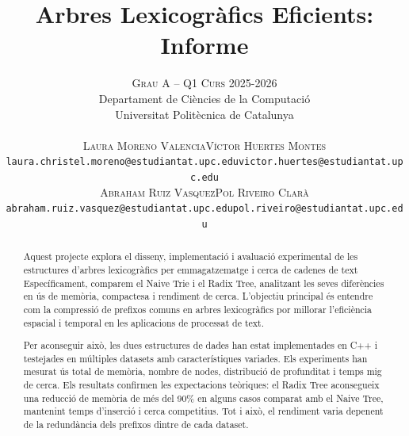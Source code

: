 \documentclass[a4paper]{article}
\title{\textbf{Arbres Lexicogràfics Eficients: Informe}}
\author{
\large
\textsc{Grau A -- Q1 Curs 2025-2026}\\[2mm] 
\normalsize Departament de Ciències de la Computació \\
\normalsize Universitat Politècnica de Catalunya \\[1cm]
%
\begin{tabular}{cc}
{\textsc{Laura Moreno Valencia}} & {\textsc{Víctor Huertes Montes}} \\
\normalsize \texttt{laura.christel.moreno@estudiantat.upc.edu} & \normalsize \texttt{victor.huertes@estudiantat.upc.edu} \\[4mm]
{\textsc{Abraham Ruiz Vasquez}} & {\textsc{Pol Riveiro Clarà}} \\
\normalsize \texttt{abraham.ruiz.vasquez@estudiantat.upc.edu} & \normalsize \texttt{pol.riveiro@estudiantat.upc.edu} \\
\end{tabular}
}
\date{}
\begin{document}
\maketitle

\begin{abstract}
Aquest projecte explora el disseny, implementació i avaluació experimental de les estructures d'arbres lexicogràfics per emmagatzematge i cerca de cadenes de text Específicament, comparem el Naive Trie i el Radix Tree, analitzant les seves diferències en ús de memòria,
compactesa i rendiment de cerca. L'objectiu principal és entendre com la compressió de prefixos comuns en arbres lexicogràfics por millorar l'eficiència espacial i temporal en les aplicacions de processat de text. 

Per aconseguir això, les dues estructures de dades han estat implementades en C++ i testejades en múltiples datasets amb característiques variades. Els experiments han mesurat ús total de memòria, nombre de nodes, distribució de profunditat i temps mig de cerca. 
Els resultats confirmen les expectacions teòriques: el Radix Tree aconsegueix una reducció de memòria de més del 90\% en alguns casos comparat amb el Naive Tree, mantenint temps d'inserció i cerca competitius. Tot i això, el rendiment varia depenent de la redundància dels prefixos dintre de cada dataset. 
\end{abstract} \newpage

 \newpage
 \newpage
 \newpage
\end{document}
